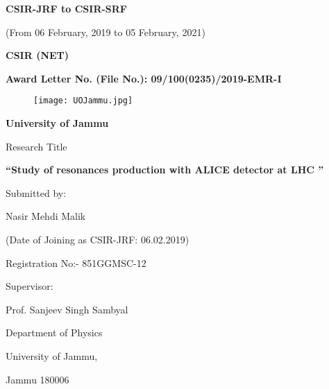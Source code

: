 \documentclass[11pt,a4paper,fleqn]{article}
\begin{document}
\begin{center}
  {\LARGE\bf CSIR-JRF to CSIR-SRF\par}
  {\LARGE  (From 06 February, 2019 to 05 February, 2021)\par}
  {\LARGE\bf CSIR (NET)\par}
  {\bf Award Letter No. (File No.): 09/100(0235)/2019-EMR-I}
  \bigskip
  
  \begin{figure}[!h]
  	\begin{center}
  		\texttt{[image: UOJammu.jpg]}
  	
  	\end{center}
  \end{figure}

  {\LARGE\bf University of Jammu\par}
  

  \vspace*{3\bigskipamount}

Research Title

  \bigskip

 \bf“Study of resonances production with ALICE detector at LHC ”

\vspace*{3\bigskipamount}

  Submitted by:

  \medskip

Nasir Mehdi Malik

  \vspace*{2\bigskipamount}
  
  

  
 (Date of Joining as CSIR-JRF: 06.02.2019)
  
  \medskip
  
  Registration No:- 851GGMSC-12
  
  \vspace*{2\bigskipamount}

  Supervisor:

  \medskip

  Prof. Sanjeev Singh Sambyal\par
  Department of Physics\par
  University of Jammu,\par
  Jammu 180006
\end{center}

\newpage
\end{document}
